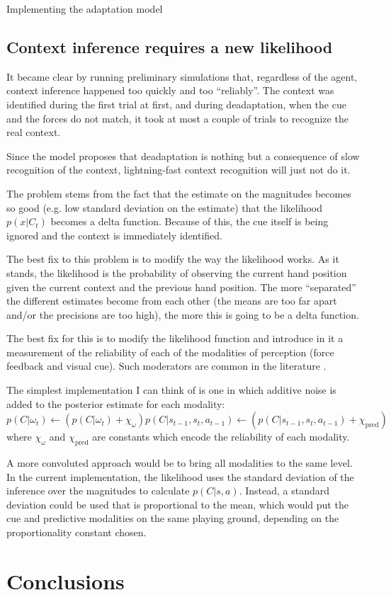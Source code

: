 \documentclass{report}
\begin{document}
\begin{chapter}{Implementing the adaptation model}
\subsection{Context inference requires a new likelihood}
\label{subsec:new-likelihood}
It became clear by running preliminary simulations that, regardless of the
agent, context inference happened too quickly and too ``reliably''. The context
was identified during the first trial at first, and during deadaptation, when
the cue and the forces do not match, it took at most a couple of trials to
recognize the real context.

Since the model proposes that deadaptation is nothing but a consequence of slow
recognition of the context, lightning-fast context recognition will just not do
it.

The problem stems from the fact that the estimate on the magnitudes becomes so
good (e.g. low standard deviation on the estimate) that the likelihood
$p(x | C_t)$ becomes a delta function. Because of this, the cue itself is being
ignored and the context is immediately identified.

The best fix to this problem is to modify the way the likelihood works. As it
stands, the likelihood is the probability of observing the current hand position
given the current context and the previous hand position. The more ``separated''
the different estimates become from each other (the means are too far apart
and/or the precisions are too high), the more this is going to be a delta
function.

The best fix for this is to modify the likelihood function and introduce in it a
measurement of the reliability of each of the modalities of perception (force
feedback and visual cue). Such moderators are common in the literature
\citep[e.g.][]{Lee_Neural_2014}.

The simplest implementation I can think of is
one in which additive noise is added to the posterior estimate for each
modality:
\begin{equation}
p(C | \omega_t) \leftarrow (p(C | \omega_t) + \chi_{\omega})
p(C | s_{t-1}, s_t, a_{t-1}) \leftarrow (p(C |  s_{t-1}, s_t, a_{t-1}) + \chi_{\text{pred}})
\end{equation}
where $\chi_{\omega}$ and $\chi_{\text{pred}}$ are constants which encode the
reliability of each modality.

A more convoluted approach would be to bring all modalities to the same
level. In the current implementation, the likelihood uses the standard deviation
of the inference over the magnitudes to calculate $p(C | s, a)$. Instead, a
standard deviation could be used that is proportional to the mean, which would
put the cue and predictive modalities on the same playing ground, depending on
the proportionality constant chosen.

\section{Conclusions}



\end{chapter}







\end{document}
